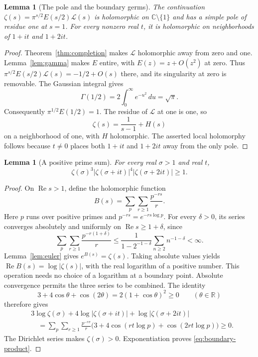 \documentclass[11pt]{article}
\newtheorem{lemma}[theorem]{Lemma}
\theoremstyle{definition}
\theoremstyle{remark}
\numberwithin{equation}{section}
\newcommand{\R}{\mathbb R}
\newcommand{\C}{\mathbb C}
\begin{document}
\begin{lemma}[The pole and the boundary germs]
\label{lem:boundary-germs}
The continuation
$\zeta(s)=\pi^{s/2}E(s/2)\mathcal L(s)$ is holomorphic on
$\C\setminus\{1\}$ and has a simple pole of residue one at $s=1$.
For every nonzero real $t$, it is holomorphic on neighborhoods of
$1+it$ and $1+2it$.
\end{lemma}
\begin{proof}
Theorem~\ref{thm:completion} makes $\mathcal L$ holomorphic away from
zero and one.  Lemma~\ref{lem:gamma} makes $E$ entire, with
$E(z)=z+O(z^2)$ at zero.
Thus $\pi^{s/2}E(s/2)\mathcal L(s)=-1/2+O(s)$ there, and its
singularity at zero is removable.
The Gaussian integral gives
\[
 \Gamma(1/2)=2\int_0^\infty e^{-u^2}\,du=\sqrt\pi.
\]
Consequently $\pi^{1/2}E(1/2)=1$.
The residue of $\mathcal L$ at one is one, so
\begin{equation}
 \zeta(s)=\frac1{s-1}+H(s)
 \label{eq:boundary-pole}
\end{equation}
on a neighborhood of one, with $H$ holomorphic.
The asserted local holomorphy follows because $t\ne0$ places both
$1+it$ and $1+2it$ away from the only pole.
\end{proof}

\begin{lemma}[A positive prime sum]
\label{lem:boundary-prime}
For every real $\sigma>1$ and real $t$,
\begin{equation}
 \zeta(\sigma)^3
 |\zeta(\sigma+it)|^4|\zeta(\sigma+2it)|\geq1.
 \label{eq:boundary-product}
\end{equation}
\end{lemma}
\begin{proof}
On $\operatorname{Re}s>1$, define the holomorphic function
\[
 B(s)=\sum_p\sum_{r\geq1}\frac{p^{-rs}}r.
\]
Here $p$ runs over positive primes and $p^{-rs}=e^{-rs\log p}$.
For every $\delta>0$, its series converges absolutely and uniformly on
$\operatorname{Re}s\geq1+\delta$, since
\[
 \sum_p\sum_{r\geq1}\frac{p^{-r(1+\delta)}}r
 \leq\frac1{1-2^{-1-\delta}}\sum_{n\geq2}n^{-1-\delta}<\infty.
\]
Lemma~\ref{lem:euler} gives $e^{B(s)}=\zeta(s)$.
Taking absolute values yields $\operatorname{Re}B(s)=\log|\zeta(s)|$,
with the real logarithm of a positive number.
This operation needs no choice of a logarithm at a boundary point.
Absolute convergence permits the three series to be combined.
The identity
\[
 3+4\cos\theta+\cos(2\theta)=2(1+\cos\theta)^2\geq0
 \qquad(\theta\in\R)
\]
therefore gives
\begin{align*}
 &3\log\zeta(\sigma)+4\log|\zeta(\sigma+it)|
                      +\log|\zeta(\sigma+2it)|\\
 &\quad=\sum_p\sum_{r\geq1}\frac{p^{-r\sigma}}r
       \bigl(3+4\cos(rt\log p)+\cos(2rt\log p)\bigr)\geq0.
\end{align*}
The Dirichlet series makes $\zeta(\sigma)>0$.
Exponentiation proves \eqref{eq:boundary-product}.
\end{proof}
\end{document}
